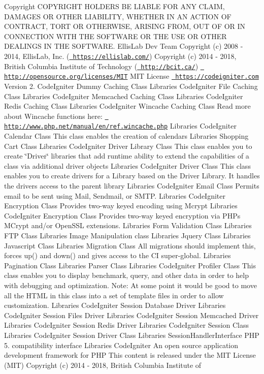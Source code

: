 \begin{DoxyCopyright}{Copyright}
C\+O\+P\+Y\+R\+I\+G\+HT H\+O\+L\+D\+E\+RS BE L\+I\+A\+B\+LE F\+OR A\+NY C\+L\+A\+IM, D\+A\+M\+A\+G\+ES OR O\+T\+H\+ER L\+I\+A\+B\+I\+L\+I\+TY, W\+H\+E\+T\+H\+ER IN AN A\+C\+T\+I\+ON OF C\+O\+N\+T\+R\+A\+CT, T\+O\+RT OR O\+T\+H\+E\+R\+W\+I\+SE, A\+R\+I\+S\+I\+NG F\+R\+OM, O\+UT OF OR IN C\+O\+N\+N\+E\+C\+T\+I\+ON W\+I\+TH T\+HE S\+O\+F\+T\+W\+A\+RE OR T\+HE U\+SE OR O\+T\+H\+ER D\+E\+A\+L\+I\+N\+GS IN T\+HE S\+O\+F\+T\+W\+A\+RE.  Ellis\+Lab Dev Team  Copyright (c) 2008 -\/ 2014, Ellis\+Lab, Inc. (\href{https://ellislab.com/}{\texttt{ https\+://ellislab.\+com/}})  Copyright (c) 2014 -\/ 2018, British Columbia Institute of Technology (\href{http://bcit.ca/}{\texttt{ http\+://bcit.\+ca/}})  \href{http://opensource.org/licenses/MIT}{\texttt{ http\+://opensource.\+org/licenses/\+M\+IT}} M\+IT License  \href{https://codeigniter.com}{\texttt{ https\+://codeigniter.\+com}}  Version 2.  Code\+Igniter Dummy Caching Class  Libraries Code\+Igniter File Caching Class  Libraries Code\+Igniter Memcached Caching Class  Libraries Code\+Igniter Redis Caching Class  Libraries Code\+Igniter Wincache Caching Class Read more about Wincache functions here\+: \href{http://www.php.net/manual/en/ref.wincache.php}{\texttt{ http\+://www.\+php.\+net/manual/en/ref.\+wincache.\+php}}  Libraries Code\+Igniter Calendar Class This class enables the creation of calendars  Libraries Shopping Cart Class  Libraries Code\+Igniter Driver Library Class This class enables you to create \char`\"{}\+Driver\char`\"{} libraries that add runtime ability to extend the capabilities of a class via additional driver objects  Libraries Code\+Igniter Driver Class This class enables you to create drivers for a Library based on the Driver Library. It handles the drivers\textquotesingle{} access to the parent library  Libraries Code\+Igniter Email Class Permits email to be sent using Mail, Sendmail, or S\+M\+TP.  Libraries Code\+Igniter Encryption Class Provides two-\/way keyed encoding using Mcrypt  Libraries Code\+Igniter Encryption Class Provides two-\/way keyed encryption via P\+HP\textquotesingle{}s M\+Crypt and/or Open\+S\+SL extensions.  Libraries Form Validation Class  Libraries F\+TP Class  Libraries Image Manipulation class  Libraries Jquery Class  Libraries Javascript Class  Libraries Migration Class All migrations should implement this, forces up() and down() and gives access to the CI super-\/global.  Libraries Pagination Class  Libraries Parser Class  Libraries Code\+Igniter Profiler Class This class enables you to display benchmark, query, and other data in order to help with debugging and optimization. Note\+: At some point it would be good to move all the H\+T\+ML in this class into a set of template files in order to allow customization.  Libraries Code\+Igniter Session Database Driver  Libraries Code\+Igniter Session Files Driver  Libraries Code\+Igniter Session Memcached Driver  Libraries Code\+Igniter Session Redis Driver  Libraries Code\+Igniter Session Class  Libraries Code\+Igniter Session Driver Class  Libraries Session\+Handler\+Interface P\+HP 5. compatibility interface  Libraries Code\+Igniter An open source application development framework for P\+HP This content is released under the M\+IT License (M\+IT) Copyright (c) 2014 -\/ 2018, British Columbia Institute of 
\end{DoxyCopyright}

